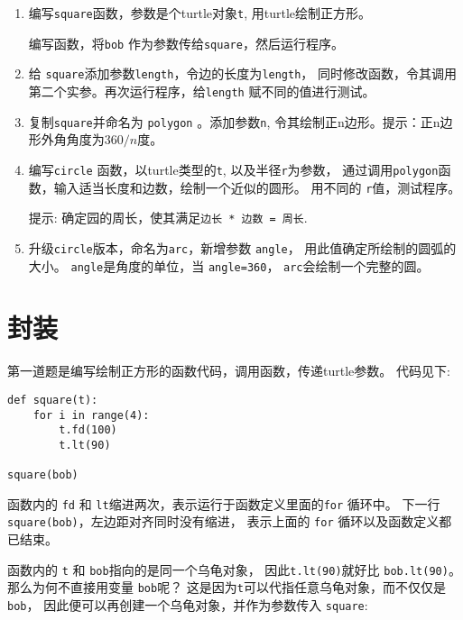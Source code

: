 \documentclass[10pt]{book}
\begin{document}
\begin{enumerate}

\item 编写{\tt square}函数，参数是个turtle对象{\tt t}, 用turtle绘制正方形。

编写函数，将{\tt bob} 作为参数传给{\tt square}，然后运行程序。

\item 给 {\tt square}添加参数{\tt length}，令边的长度为{\tt length}，
同时修改函数，令其调用第二个实参。再次运行程序，给{\tt length} 赋不同的值进行测试。

\item 复制{\tt square}并命名为 {\tt polygon} 。添加参数{\tt n},
令其绘制正n边形。提示：正n边形外角角度为$360/n$度。

\item 编写{\tt circle} 函数，以turtle类型的{\tt t}, 以及半径{\tt r}为参数，
通过调用{\tt polygon}函数，输入适当长度和边数，绘制一个近似的圆形。
用不同的 {\tt r}值，测试程序。 

提示: 确定园的周长，使其满足{\tt 边长 * 边数 = 周长}.

\item 升级{\tt circle}版本，命名为{\tt arc}，新增参数 {\tt angle}，
用此值确定所绘制的圆弧的大小。
 {\tt angle}是角度的单位，当 {\tt angle=360}，  {\tt arc}会绘制一个完整的圆。

\end{enumerate}


\section{封装}

第一道题是编写绘制正方形的函数代码，调用函数，传递turtle参数。
代码见下:

\begin{verbatim}
def square(t):
    for i in range(4):
        t.fd(100)
        t.lt(90)

square(bob)
\end{verbatim}
%
函数内的 {\tt fd} 和 {\tt lt}缩进两次，表示运行于函数定义里面的{\tt for} 循环中。
下一行 {\tt square(bob)}，左边距对齐同时没有缩进，
表示上面的 {\tt for} 循环以及函数定义都已结束。

函数内的 {\tt t} 和 {\tt bob}指向的是同一个乌龟对象，
因此{\tt t.lt(90)}就好比 {\tt bob.lt(90)}。
那么为何不直接用变量 {\tt bob}呢？
这是因为{\tt t}可以代指任意乌龟对象，而不仅仅是 {\tt bob}，
因此便可以再创建一个乌龟对象，并作为参数传入 {\tt square}:
\end{document}
